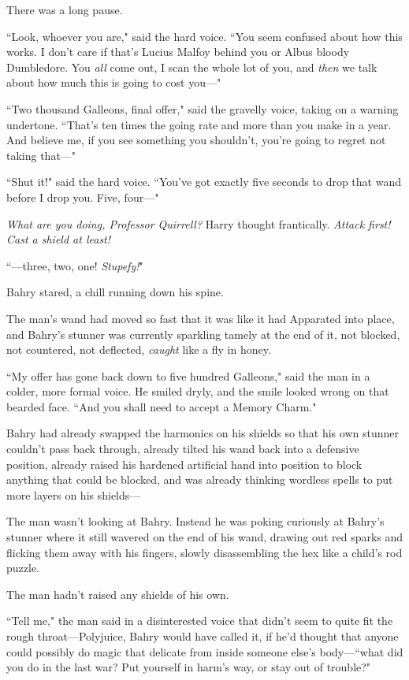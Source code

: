 There was a long pause.

``Look, whoever you are," said the hard voice. ``You seem confused about how this works. I don't care if that's Lucius Malfoy behind you or Albus bloody Dumbledore. You \emph{all} come out, I scan the whole lot of you, and \emph{then} we talk about how much this is going to cost you---"

``Two thousand Galleons, final offer," said the gravelly voice, taking on a warning undertone. ``That's ten times the going rate and more than you make in a year. And believe me, if you see something you shouldn't, you're going to regret not taking that---"

``Shut it!" said the hard voice. ``You've got exactly five seconds to drop that wand before I drop you. Five, four---"

\emph{What are you doing, Professor Quirrell?} Harry thought frantically. \emph{Attack first! Cast a shield at least!}

``---three, two, one! \emph{Stupefy!}"

\later

Bahry stared, a chill running down his spine.

The man's wand had moved so fast that it was like it had Apparated into place, and Bahry's stunner was currently sparkling tamely at the end of it, not blocked, not countered, not deflected, \emph{caught} like a fly in honey.

``My offer has gone back down to five hundred Galleons," said the man in a colder, more formal voice. He smiled dryly, and the smile looked wrong on that bearded face. ``And you shall need to accept a Memory Charm."

Bahry had already swapped the harmonics on his shields so that his own stunner couldn't pass back through, already tilted his wand back into a defensive position, already raised his hardened artificial hand into position to block anything that could be blocked, and was already thinking wordless spells to put more layers on his shields---

The man wasn't looking at Bahry. Instead he was poking curiously at Bahry's stunner where it still wavered on the end of his wand, drawing out red sparks and flicking them away with his fingers, slowly disassembling the hex like a child's rod puzzle.

The man hadn't raised any shields of his own.

``Tell me," the man said in a disinterested voice that didn't seem to quite fit the rough throat---Polyjuice, Bahry would have called it, if he'd thought that anyone could possibly do magic that delicate from inside someone else's body---``what did you do in the last war? Put yourself in harm's way, or stay out of trouble?"


